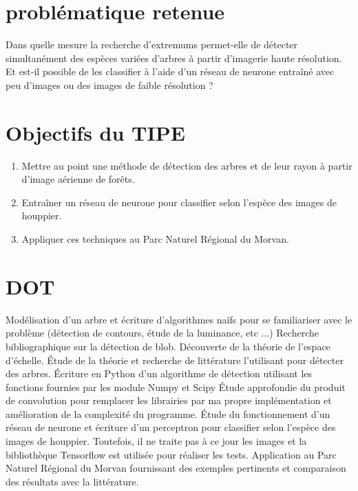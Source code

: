 \documentclass{article}
\begin{document}
\section{problématique retenue}

Dans quelle mesure la recherche d'extremums permet-elle de détecter simultanément des espèces variées d'arbres à partir d'imagerie haute résolution. Et est-il possible de les classifier à l'aide d'un réseau de neurone entraîné avec peu d'images ou des images de faible résolution ? 

\section{Objectifs du TIPE}

\begin{enumerate}
	\item Mettre au point une méthode de détection des arbres et de leur rayon à partir d'image aérienne de forêts.  
    \item Entraîner un réseau de neurone pour classifier selon l'espèce des images de houppier.
	\item Appliquer ces techniques au Parc Naturel Régional du Morvan.   
\end{enumerate}
	
\section{DOT}

Modélisation d'un arbre et écriture d'algorithmes naïfs pour se familiariser avec le problème (détection de contours, étude de la luminance, etc ...) Recherche bibliographique sur la détection de blob. Découverte de la théorie de l'espace d'échelle.
Étude de la théorie et recherche de littérature l'utilisant pour détecter des arbres.
Écriture en Python d'un algorithme de détection utilisant les fonctions fournies par les module Numpy et Scipy 
Étude approfondie du produit de convolution pour remplacer les librairies par ma propre implémentation et amélioration de la complexité du programme. 
Étude du fonctionnement d'un réseau de neurone et écriture d'un perceptron pour classifier selon l'espèce des images de houppier. Toutefois, il ne traite pas à ce jour les images et la bibliothèque Tensorflow est utilisée pour réaliser les tests.
Application au Parc Naturel Régional du Morvan fournissant des exemples pertinents et comparaison des résultats avec la littérature.
\end{document}
